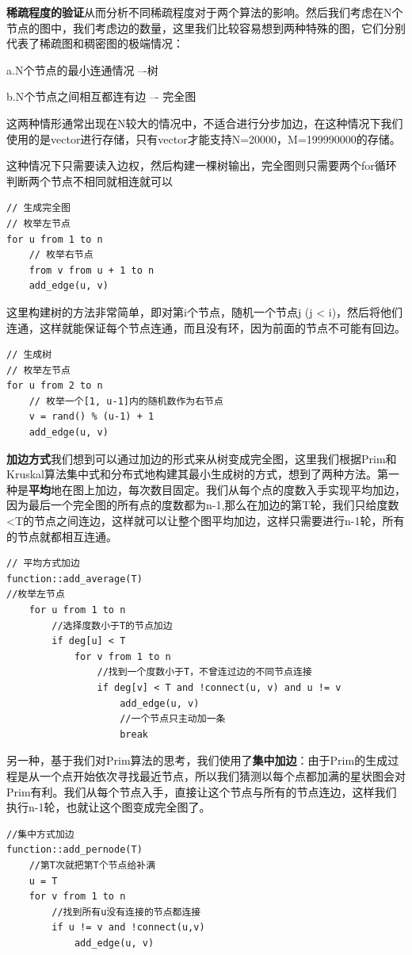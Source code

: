 \documentclass[UTF8]{ctexart}
\begin{document}
\noindent\textbf{稀疏程度的验证}\quad 从而分析不同稀疏程度对于两个算法的影响。然后我们考虑在N个节点的图中，我们考虑边的数量，这里我们比较容易想到两种特殊的图，它们分别代表了稀疏图和稠密图的极端情况：

a.N个节点的最小连通情况 –-树

b.N个节点之间相互都连有边 –- 完全图

这两种情形通常出现在N较大的情况中，不适合进行分步加边，在这种情况下我们使用的是vector进行存储，只有vector才能支持N=20000，M=199990000的存储。

这种情况下只需要读入边权，然后构建一棵树输出，完全图则只需要两个for循环判断两个节点不相同就相连就可以

\begin{lstlisting}
// 生成完全图
// 枚举左节点
for u from 1 to n
    // 枚举右节点
    from v from u + 1 to n
    add_edge(u, v)
\end{lstlisting}

这里构建树的方法非常简单，即对第i个节点，随机一个节点j (j < i)，然后将他们连通，这样就能保证每个节点连通，而且没有环，因为前面的节点不可能有回边。
\begin{lstlisting}
// 生成树
// 枚举左节点
for u from 2 to n
    // 枚举一个[1, u-1]内的随机数作为右节点
    v = rand() % (u-1) + 1
    add_edge(u, v)
\end{lstlisting}


\textbf{加边方式}\quad 我们想到可以通过加边的形式来从树变成完全图，这里我们根据Prim和Kruskal算法集中式和分布式地构建其最小生成树的方式，想到了两种方法。第一种是\textbf{平均}地在图上加边，每次数目固定。我们从每个点的度数入手实现平均加边，因为最后一个完全图的所有点的度数都为n-1,那么在加边的第T轮，我们只给度数<T的节点之间连边，这样就可以让整个图平均加边，这样只需要进行n-1轮，所有的节点就都相互连通。

\begin{lstlisting}
// 平均方式加边
function::add_average(T)
//枚举左节点
    for u from 1 to n
        //选择度数小于T的节点加边
        if deg[u] < T
            for v from 1 to n
                //找到一个度数小于T，不曾连过边的不同节点连接
                if deg[v] < T and !connect(u, v) and u != v
                    add_edge(u, v)
                    //一个节点只主动加一条
                    break
\end{lstlisting}

另一种，基于我们对Prim算法的思考，我们使用了\textbf{集中加边}：由于Prim的生成过程是从一个点开始依次寻找最近节点，所以我们猜测以每个点都加满的星状图会对Prim有利。我们从每个节点入手，直接让这个节点与所有的节点连边，这样我们执行n-1轮，也就让这个图变成完全图了。
\begin{lstlisting}
//集中方式加边
function::add_pernode(T)
    //第T次就把第T个节点给补满
    u = T
    for v from 1 to n
        //找到所有u没有连接的节点都连接
        if u != v and !connect(u,v)
            add_edge(u, v)
\end{lstlisting}
\end{document}
